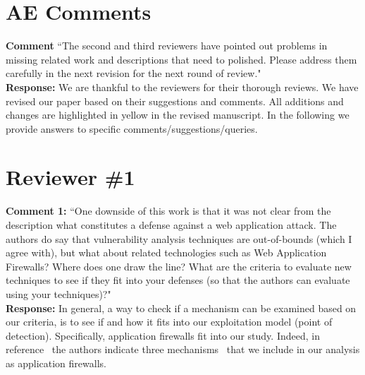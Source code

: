 \documentclass[10pt,journal,compsoc]{IEEEtran}
\begin{document}
\maketitle

\IEEEdisplaynontitleabstractindextext

\IEEEpeerreviewmaketitle

\section{AE Comments}
\label{sec:ae}

{\bf Comment} ``The second and third reviewers
have pointed out problems in missing related work and
descriptions that need to polished.
Please address them carefully in the next revision
for the next round of review."\\

\noindent
{\bf Response:}
We are thankful to the reviewers for their thorough reviews.
We have revised our paper based on their suggestions and comments.
All additions and changes are highlighted in yellow
in the revised manuscript.
In the following we provide answers to specific
comments/suggestions/queries.\\

\section{Reviewer \#1}
\label{sec:r1}

{\bf Comment 1:} ``One downside of this work is that it was not clear from the
description what constitutes a defense against a web application
attack. The authors do say that vulnerability analysis techniques are
out-of-bounds (which I agree with), but what about related
technologies such as Web Application Firewalls? Where does one draw
the line? What are the criteria to evaluate new techniques to see if
they fit into your defenses (so that the authors can evaluate using
your techniques)?"\\

\noindent
{\bf Response:}
In general,
a way to check if a mechanism can be examined
based on our criteria,
is to see if and how it fits into our
exploitation model (point of detection).
Specifically,
application firewalls
fit into our study.
Indeed,
in reference~\cite{DPJV06}
the authors indicate three mechanisms~\cite{BK04,PB05,HO05b}
that we include in our analysis as
application firewalls.\\

\end{document}
